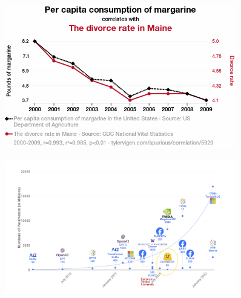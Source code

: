 \documentclass[
	xcolor={svgnames},
	aspectratio=169,
	french,
]{beamer}
\begin{document}
\begin{frame}[plain]
	\begin{figure}
		\includegraphics[width=0.9\textwidth]{pics/5920_per-capita-consumption-of-margarine_correlates-with_the-divorce-rate-in-maine.png}
	\end{figure}
	\parencite{vigen2024CapitaConsumptionMargarine}
\end{frame}

\begin{frame}[plain]
	\begin{figure}
		\includegraphics[width=0.9\textwidth]{pics/trends-in-model-sizes.png}
	\end{figure}
	\parencite{mehta2023SemanticTokenizerEnhanced}
\end{frame}
\end{document}
